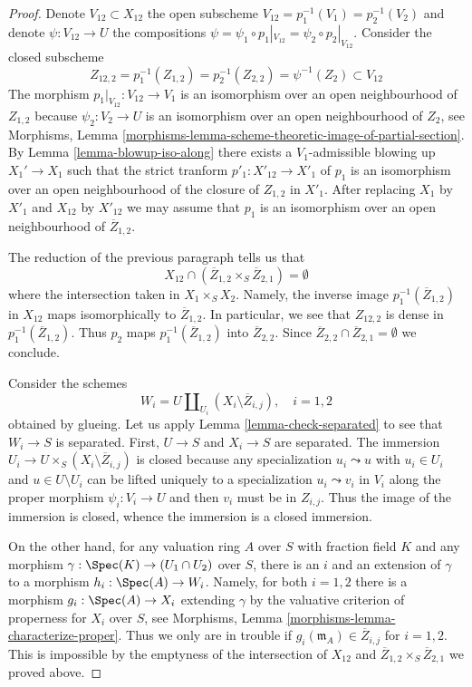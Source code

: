\begin{proof}
\medskip\noindent
Denote $V_{12} \subset X_{12}$ the open subscheme
$V_{12} = p_1^{-1}(V_1) = p_2^{-1}(V_2)$ and denote
$\psi : V_{12} \to U$ the compositions
$\psi = \psi_1 \circ p_1|_{V_{12}} = \psi_2 \circ p_2|_{V_{12}}$.
Consider the closed subscheme
$$
Z_{12, 2} = p_1^{-1}(Z_{1, 2}) = p_2^{-1}(Z_{2, 2}) = \psi^{-1}(Z_2)
\subset V_{12}
$$
The morphism $p_1|_{V_{12}} : V_{12} \to V_1$ is an isomorphism
over an open neighbourhood of $Z_{1, 2}$ because $\psi_2 : V_2 \to U$
is an isomorphism over an open neighbourhood of $Z_2$, see
Morphisms, Lemma
\ref{morphisms-lemma-scheme-theoretic-image-of-partial-section}.
By Lemma \ref{lemma-blowup-iso-along}
there exists a $V_1$-admissible blowing up $X_1' \to X_1$
such that the strict tranform $p'_1 : X'_{12} \to X'_1$
of $p_1$ is an isomorphism over an open neighbourhood of
the closure of $Z_{1, 2}$ in $X'_1$.
After replacing $X_1$ by $X'_1$ and $X_{12}$ by $X'_{12}$
we may assume that $p_1$ is an isomorphism over an open
neighbourhood of $\overline{Z}_{1, 2}$.

\medskip\noindent
The reduction of the previous paragraph tells us that
$$
X_{12} \cap (\overline{Z}_{1, 2} \times_S \overline{Z}_{2, 1}) = \emptyset
$$
where the intersection taken in $X_1 \times_S X_2$. Namely, the inverse
image $p_1^{-1}(\overline{Z}_{1, 2})$ in $X_{12}$ maps isomorphically
to $\overline{Z}_{1, 2}$. In particular, we see that $Z_{12, 2}$
is dense in $p_1^{-1}(\overline{Z}_{1, 2})$. Thus $p_2$ maps
$p_1^{-1}(\overline{Z}_{1, 2})$ into $\overline{Z}_{2, 2}$.
Since $\overline{Z}_{2, 2} \cap \overline{Z}_{2, 1} = \emptyset$
we conclude.

\medskip\noindent
Consider the schemes
$$
W_i = U \coprod\nolimits_{U_i} (X_i \setminus \overline{Z}_{i, j}),
\quad i = 1, 2
$$
obtained by glueing. Let us apply Lemma \ref{lemma-check-separated}
to see that $W_i \to S$ is separated. First,
$U \to S$ and $X_i \to S$ are separated. The immersion
$U_i \to U \times_S (X_i \setminus \overline{Z}_{i, j})$
is closed because any specialization $u_i \leadsto u$
with $u_i \in U_i$ and $u \in U \setminus U_i$
can be lifted uniquely to a specialization
$u_i \leadsto v_i$ in $V_i$ along the proper morphism
$\psi_i : V_i \to U$ and then $v_i$ must be in $Z_{i, j}$.
Thus the image of the immersion is closed, whence the immersion
is a closed immersion.

\medskip\noindent
On the other hand, for any valuation ring $A$ over $S$ with fraction field $K$
and any morphism $\gamma : \Spec(K) \to (U_1 \cap U_2)$ over $S$, there
is an $i$ and an extension of $\gamma$ to a morphism $h_i : \Spec(A) \to W_i$.
Namely, for both $i = 1, 2$ there is a morphism
$g_i : \Spec(A) \to X_i$ extending $\gamma$ by the
valuative criterion of properness for $X_i$ over $S$, see
Morphisms, Lemma \ref{morphisms-lemma-characterize-proper}.
Thus we only are in trouble
if $g_i(\mathfrak m_A) \in \overline{Z}_{i, j}$ for $i = 1, 2$. This is
impossible by the emptyness of the intersection of $X_{12}$ and
$\overline{Z}_{1, 2} \times_S \overline{Z}_{2, 1}$ we proved above.


\end{proof}
